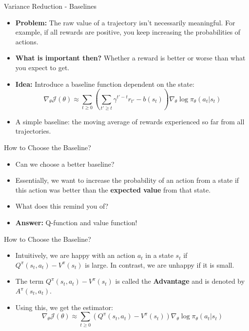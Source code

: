 \begin{frame}{Variance Reduction - Baselines}
\begin{itemize}
    \item \textbf{Problem:} The raw value of a trajectory isn’t necessarily meaningful. For example, if all rewards are positive, you keep increasing the probabilities of actions.
    \pause
    \item \textbf{What is important then?} Whether a reward is better or worse than what you expect to get.
    \pause
    \item \textbf{Idea:} Introduce a baseline function dependent on the state:
    $$\nabla_\theta \mathcal{J}(\theta) \approx \sum_{t \geq 0} \left( \sum_{t' \geq t} \gamma^{t'-t} r_{t'}  - b(s_t)\right ) \nabla_\theta \log \pi_\theta (a_t|s_t) $$
    \pause
    \item A simple baseline: the moving average of rewards experienced so far from all trajectories.
\end{itemize}
\end{frame}

\begin{frame}{How to Choose the Baseline?}
\begin{itemize}
    \item Can we choose a better baseline?
    \item Essentially, we want to increase the probability of an action from a state if this action was better than the \textbf{expected value} from that state.
    \pause
    \item What does this remind you of?
    \pause
    \item \textbf{Answer:} Q-function and value function!
\end{itemize}
\end{frame}

\begin{frame}{How to Choose the Baseline?}
\begin{itemize}
    \item Intuitively, we are happy with an action $a_t$ in a state $s_t$ if $Q^{\pi}(s_t, a_t) - V^{\pi}(s_t)$ is large. In contrast, we are unhappy if it is small.
    \pause
    \item The term $Q^{\pi}(s_t, a_t) - V^{\pi}(s_t)$ is called the \textbf{Advantage} and is denoted by $A^{\pi}(s_t, a_t)$.
    \pause
    \item Using this, we get the estimator:
    $$\nabla_\theta \mathcal{J}(\theta) \approx \sum_{t \geq 0} \left( Q^{\pi}(s_t, a_t) - V^{\pi}(s_t) \right ) \nabla_\theta \log \pi_\theta (a_t|s_t) $$
\end{itemize}
\end{frame}
